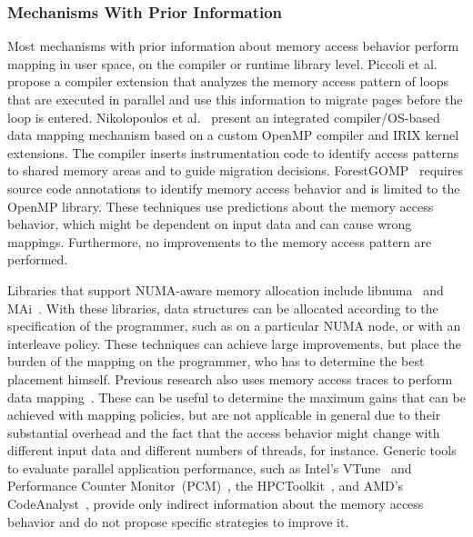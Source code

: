 
\subsubsection{Mechanisms With Prior Information}

Most mechanisms with prior information about memory access behavior perform mapping in user space, on the compiler or runtime library level.
Piccoli et al.~\cite{Piccoli2014} propose a compiler extension that analyzes the memory access pattern of loops that are executed in parallel and use this information to migrate pages before the loop is entered.
Nikolopoulos et al.~\cite{Nikolopoulos2000a,Nikolopoulos2000} present an integrated compiler/OS-based data mapping mechanism based on a custom OpenMP compiler and IRIX kernel extensions. The compiler inserts instrumentation code to identify access patterns to shared memory areas and to guide migration decisions.
ForestGOMP~\cite{Broquedis2010a} requires source code annotations to identify memory access behavior and is limited to the OpenMP library.
These techniques use predictions about the memory access behavior, which might be dependent on input data and can cause wrong mappings.
Furthermore, no improvements to the memory access pattern are performed.

Libraries that support NUMA-aware memory allocation include libnuma~\cite{Kleen2004} and MAi~\cite{Ribeiro2009}. With these libraries, data structures can be allocated according to the specification of the programmer, such as on a particular NUMA node, or with an interleave policy. These techniques can achieve large improvements, but place the burden of the mapping on the programmer, who has to determine the best placement himself.
%
Previous research also uses memory access traces to perform data mapping~\cite{Diener2015,Marathe2010,Bolosky1992}. These can be useful to determine the maximum gains that can be achieved with mapping policies, but are not applicable in general due to their substantial overhead and the fact that the access behavior might change with different input data and different numbers of threads, for instance.
Generic tools to evaluate parallel application performance, such as Intel's VTune~\cite{Reinders05VTune} and Performance Counter Monitor~(PCM)~\cite{Intel2012b}, the HPCToolkit~\cite{Adhianto10HPCTOOLKIT}, and AMD's CodeAnalyst~\cite{Drongowski2008}, provide only indirect information about the memory access behavior and do not propose specific strategies to improve it.



